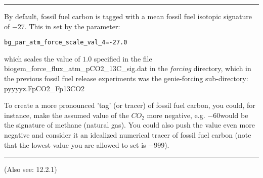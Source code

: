 \vspace{1mm} \noindent\rule{4cm}{0.1mm} \vspace{2mm}

\noindent By default, fossil fuel carbon is tagged with a mean fossil fuel isotopic signature of \(-27\)\permille. This in set by the parameter:
\vspace{-1mm}\small\begin{verbatim}
bg_par_atm_force_scale_val_4=-27.0
\end{verbatim}\normalsize\vspace{-1mm}
which scales the value of \(1.0\) specified in the file \textsf{\footnotesize biogem\_force\_flux\_atm\_pCO2\_13C\_sig.dat} in the \textit{forcing} directory, which in the previous fossil fuel release experiments was the \textsf{\footnotesize genie-forcing} sub-directory: \textsf{\footnotesize pyyyyz.FpCO2\_Fp13CO2}

\vspace{1mm}

To create a more pronounced 'tag' (or tracer) of fossil fuel carbon, you could, for instance, make the assumed value of the \(CO_{2}\) more negative, e.g. \(-60\)\permille would be the signature of methane (natural gas). You could also push the value even more negative and consider it an idealized numerical tracer of fossil fuel carbon (note that the lowest value you are allowed to set is \(-999\)\permille).

\vspace{1mm} \noindent\rule{4cm}{0.1mm} \vspace{2mm}

\noindent (Also see: 12.2.1)

